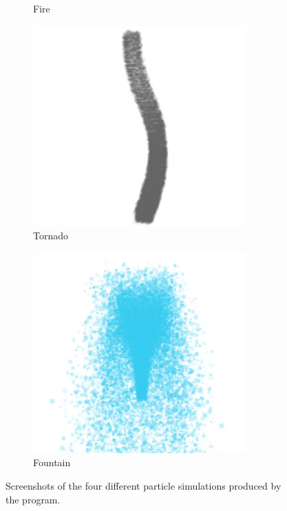 \documentclass[a4paper]{article}
\begin{document}
\begin{figure}[htbp]
\begin{subfigure}[ht]{0.22\textwidth}
        \caption{Fire}
        \label{fig:simulations_fire}
    \end{subfigure}
    \begin{subfigure}[ht]{0.22\textwidth}
        \includegraphics[width=\textwidth]{figures/tornado.png}
        \caption{Tornado}
        \label{fig:simulations_tornado}
    \end{subfigure}
    \begin{subfigure}[ht]{0.22\textwidth}
        \includegraphics[width=\textwidth]{figures/water.png}
        \caption{Fountain}
        \label{fig:simulations_fountain}
    \end{subfigure}

    \caption{Screenshots of the four different particle simulations produced by the program.}
    \label{fig:simulations}
\end{figure}

\begin{multicols*}{2}

\printbibliography
\end{multicols*}
\end{document}
